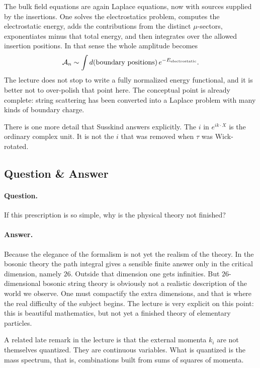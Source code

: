 The bulk field equations are again Laplace equations, now with sources supplied by the insertions. One solves the electrostatics problem, computes the electrostatic energy, adds the contributions from the distinct \(\mu\)-sectors, exponentiates minus that total energy, and then integrates over the allowed insertion positions. In that sense the whole amplitude becomes
\begin{equation}
\mathcal{A}_n \sim \int d(\hbox{boundary positions})\, e^{-E_{\rm electrostatic}}.
\end{equation}
The lecture does not stop to write a fully normalized energy functional, and it is better not to over-polish that point here. The conceptual point is already complete: string scattering has been converted into a Laplace problem with many kinds of boundary charge.

There is one more detail that Susskind answers explicitly. The \(i\) in \(e^{ik\cdot X}\) is the ordinary complex unit. It is not the \(i\) that was removed when \(\tau\) was Wick-rotated.

\subsection{Question \& Answer}

\paragraph{Question.} If this prescription is so simple, why is the physical theory not finished?

\paragraph{Answer.} Because the elegance of the formalism is not yet the realism of the theory. In the bosonic theory the path integral gives a sensible finite answer only in the critical dimension, namely \(26\). Outside that dimension one gets infinities. But \(26\)-dimensional bosonic string theory is obviously not a realistic description of the world we observe. One must compactify the extra dimensions, and that is where the real difficulty of the subject begins. The lecture is very explicit on this point: this is beautiful mathematics, but not yet a finished theory of elementary particles.

A related late remark in the lecture is that the external momenta \(k_i\) are not themselves quantized. They are continuous variables. What is quantized is the mass spectrum, that is, combinations built from sums of squares of momenta.

